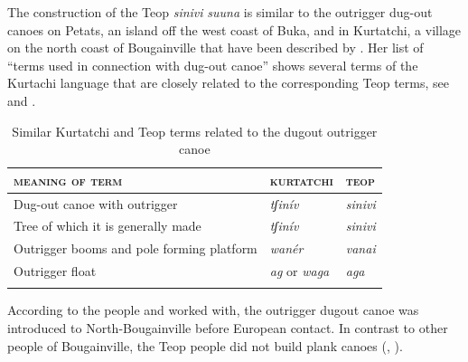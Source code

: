 \documentclass[output=paper]{langscibook}
\begin{document}
The construction of the Teop \textit{sinivi} \textit{suuna}  is similar to the outrigger dug-out canoes on Petats, an island off the west coast of Buka, and in Kurtatchi, a village on the north coast of Bougainville that have been described by \textcite[360-381]{Blackwood:1935im}. Her list of ``terms used in connection with dug-out canoe'' shows several terms of the Kurtachi language that are closely related to the corresponding Teop terms, see  and \textcite[367]{Blackwood:1935im}.
\begin{table}[h]
    \caption{Similar Kurtatchi and Teop terms related to the dugout outrigger canoe}
    \label{tab:canoe}
    \begin{tabularx}{.9\textwidth}{lll}
        \lsptoprule
            \textsc{meaning of term}&\textsc{kurtatchi}&\textsc{teop}\\
        \midrule
            Dug-out canoe with outrigger&\textit{tʃinív}&\textit{sinivi}\\
            Tree of which it is generally  made&\textit{tʃinív}&\textit{sinivi}\\
            Outrigger booms and pole forming  platform&\textit{wanér}&\textit{vanai}\\
            Outrigger float&\textit{ag} or \textit{waga}&\textit{aga}\\
        \lspbottomrule
    \end{tabularx}
\end{table}
According to the people \textcite[360]{Blackwood:1935im} and \textcite[186]{Shoffner:1976eg} worked with, the outrigger dugout canoe was introduced to North-Bougainville before European contact. In contrast to other people of Bougainville, the Teop people did not build plank canoes (\cite[370]{Blackwood:1935im}, \cite[186]{Shoffner:1976eg}).
\end{document}
